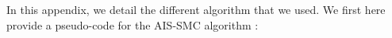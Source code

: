\documentclass[11pt,a4paper]{article}
\begin{document}
In this appendix, we detail the different algorithm that we used. We first here provide a pseudo-code for the AIS-SMC algorithm : 

%		
%
%		
%
%
%		
%		
%		
%		
\end{document}
